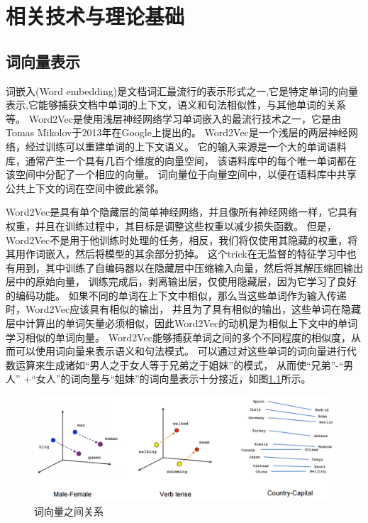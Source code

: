 \chapter{相关技术与理论基础}

\section{词向量表示}

词嵌入(Word embedding)是文档词汇最流行的表示形式之一,它是特定单词的向量表示,它能够捕获文档中单词的上下文，语义和句法相似性，与其他单词的关系等。
Word2Vec是使用浅层神经网络学习单词嵌入的最流行技术之一，它是由Tomas Mikolov于2013年在Google上提出的。
Word2Vec是一个浅层的两层神经网络，经过训练可以重建单词的上下文语义。 它的输入来源是一个大的单词语料库，通常产生一个具有几百个维度的向量空间，
该语料库中的每个唯一单词都在该空间中分配了一个相应的向量。 词向量位于向量空间中，以便在语料库中共享公共上下文的词在空间中彼此紧邻。 

  Word2Vec是具有单个隐藏层的简单神经网络，并且像所有神经网络一样，它具有权重，并且在训练过程中，其目标是调整这些权重以减少损失函数。 
  但是，Word2Vec不是用于他训练时处理的任务，相反，我们将仅使用其隐藏的权重，将其用作词嵌入，然后将模型的其余部分扔掉。
  这个trick在无监督的特征学习中也有用到，其中训练了自编码器以在隐藏层中压缩输入向量，然后将其解压缩回输出层中的原始向量，
  训练完成后，剥离输出层，仅使用隐藏层，因为它学习了良好的编码功能。
  如果不同的单词在上下文中相似，那么当这些单词作为输入传递时，Word2Vec应该具有相似的输出，
  并且为了具有相似的输出，这些单词在隐藏层中计算出的单词矢量必须相似，因此Word2Vec的动机是为相似上下文中的单词学习相似的单词向量。
Word2Vec能够捕获单词之间的多个不同程度的相似度，从而可以使用词向量来表示语义和句法模式。
可以通过对这些单词的词向量进行代数运算来生成诸如“男人之于女人等于兄弟之于姐妹”的模式，
从而使“兄弟”-“男人” +“女人”的词向量与“姐妹”的词向量表示十分接近，如图\ref{fig:linear-relationships}所示。


\begin{figure}[htbp]
  \centering
  \includegraphics[scale=0.5]{./images/linear-relationships.jpg}
  \caption{词向量之间关系}
  \label{fig:linear-relationships}
\end{figure}


